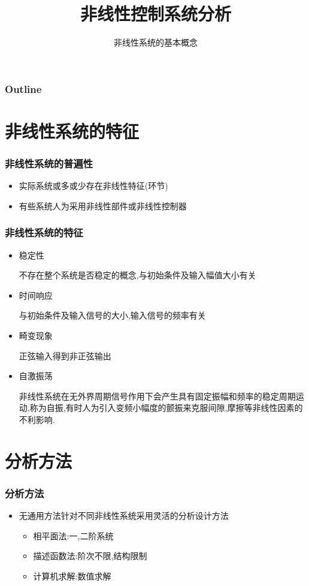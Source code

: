 \documentclass[table]{beamer}
\subtitle{非线性系统的基本概念}
\title{非线性控制系统分析}
\author{}
\date{}
\begin{document}
\maketitle

\begin{frame}
\frametitle{Outline}
\setcounter{tocdepth}{3}
\tableofcontents
\end{frame}












\section{非线性系统的特征}
\label{sec-1}
\begin{frame}
\frametitle{非线性系统的普遍性}
\label{sec-1-1}

\begin{itemize}
\item 实际系统或多或少存在非线性特征(环节)
\item <2->有些系统人为采用非线性部件或非线性控制器
\end{itemize}
\end{frame}
\begin{frame}
\frametitle{非线性系统的特征}
\label{sec-1-2}

\begin{itemize}
\item <2->稳定性

   不存在整个系统是否稳定的概念,与初始条件及输入幅值大小有关
\item <3->时间响应

   与初始条件及输入信号的大小,输入信号的频率有关
\item <4->畸变现象

   正弦输入得到非正弦输出
\item <5->自激振荡

   非线性系统在无外界周期信号作用下会产生具有固定振幅和频率的稳定周期运动,称为自振,有时人为引入变频小幅度的颤振来克服间隙,摩擦等非线性因素的不利影响.
\end{itemize}
\end{frame}
\section{分析方法}
\label{sec-2}
\begin{frame}
\frametitle{分析方法}
\label{sec-2-1}

\begin{itemize}
\item <2->无通用方法针对不同非线性系统采用灵活的分析设计方法
\begin{itemize}
\item <3->相平面法:一,二阶系统
\item <4->描述函数法:阶次不限,结构限制
\item <5->计算机求解:数值求解
\end{itemize}
\end{itemize}
\end{frame}
\end{document}
